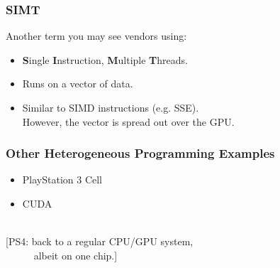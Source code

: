 \begin{frame}
  \frametitle{SIMT}



  Another term you may see vendors using:

  \begin{itemize}
    \item {\bf S}ingle {\bf I}nstruction, {\bf M}ultiple {\bf T}hreads.
    \item Runs on a vector of data.
    \item Similar to SIMD instructions (e.g. SSE).\\
     However, the vector is spread out over the GPU.
  \end{itemize}

\end{frame}

\begin{frame}
  \frametitle{Other Heterogeneous Programming Examples}

\Large

\begin{itemize}
\item PlayStation 3 Cell\\
\item CUDA
\end{itemize}
~\\[1em]
[PS4: back to a regular CPU/GPU system, \\ $\qquad$ ~albeit on one chip.]

\end{frame}

